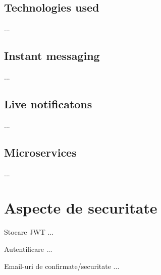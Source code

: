     \subsection{Technologies used}
    \label{Interconnected-technologies}
    ... 
    
    \subsection{Instant messaging}
    \label{Instant messaging}
    ...
    
    \subsection{Live notificatons}
    \label{Live notifications}
    ...
    
    \subsection{Microservices}
    \label{Microservices}
    ...
    
    \section{Aspecte de securitate}
    \label{Aspecte de securitate}
    Stocare JWT ...

    Autentificare ...

    Email-uri de confirmate/securitate ...
    
\newpage